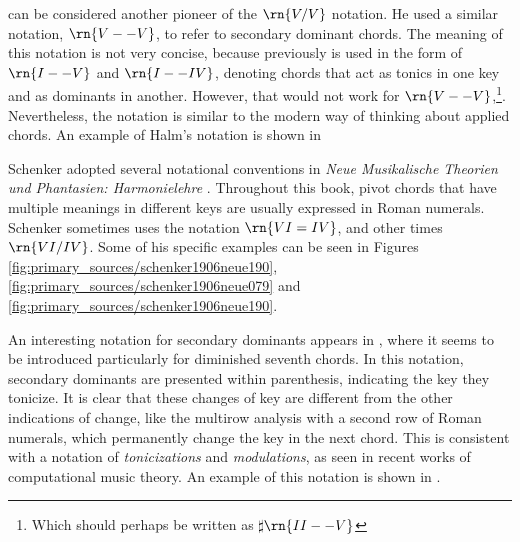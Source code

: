 \textcite{halm1900harmonielehre} can be considered another
pioneer of the $\rn{V/V}$ notation. He used a similar
notation, $\rn{V--V}$, to refer to secondary dominant
chords. The meaning of this notation is not very concise,
because previously is used in the form of $\rn{I--V}$ and
$\rn{I--IV}$, denoting chords that act as tonics in one key
and as dominants in another. However, that would not work
for $\rn{V--V}$,\footnote{Which should perhaps be written as
$\sharp{}\rn{II--V}$}. Nevertheless, the notation is similar
to the modern way of thinking about applied chords. An
example of Halm's notation is shown in


Schenker adopted several notational conventions in
\emph{Neue Musikalische Theorien und Phantasien:
Harmonielehre} \parencite{schenker1906neue}. Throughout this
book, pivot chords that have multiple meanings in different
keys are usually expressed in Roman numerals. Schenker
sometimes uses the notation $\rn{VI=IV}$, and other times
$\rn{VI/IV}$. Some of his specific examples can be seen in
Figures \ref{fig:primary_sources/schenker1906neue190},
\ref{fig:primary_sources/schenker1906neue079} and
\ref{fig:primary_sources/schenker1906neue190}.




An interesting notation for secondary dominants appears in
\textcite{white1911harmonic}, where it seems to be
introduced particularly for diminished seventh chords. In
this notation, secondary dominants are presented within
parenthesis, indicating the key they tonicize. It is clear
that these changes of key are different from the other
indications of change, like the multirow analysis with a
second row of Roman numerals, which permanently change the
key in the next chord. This is consistent with a notation of
\emph{tonicizations} and \emph{modulations}, as seen in
recent works of computational music theory. An example of
this notation is shown in
.


